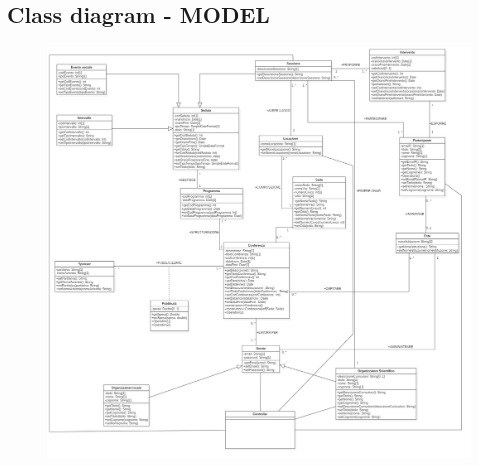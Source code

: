 \documentclass[a4paper,italian,10pt,openany]{book}
\begin{document}
	\subsection{Class diagram - MODEL}
	\vspace{2cm}
	\begin{figure}[h!]
	\centering
	\includegraphics[width=18cm]{ClassDiagram MODEL}
	\end{figure}
	\newpage
\end{document}
